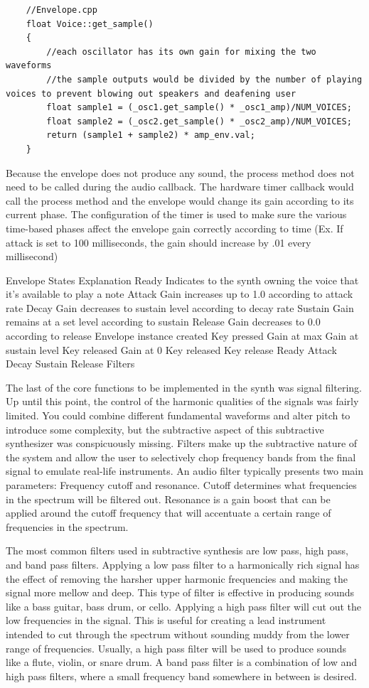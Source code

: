 \documentclass[acmlarge,screen]{acmart}
\begin{document}
	\begin{lstlisting}
	//Envelope.cpp
	float Voice::get_sample()
	{   
		//each oscillator has its own gain for mixing the two waveforms
		//the sample outputs would be divided by the number of playing voices to prevent blowing out speakers and deafening user
		float sample1 = (_osc1.get_sample() * _osc1_amp)/NUM_VOICES; 
		float sample2 = (_osc2.get_sample() * _osc2_amp)/NUM_VOICES;
		return (sample1 + sample2) * amp_env.val;
	}
	\end{lstlisting}
	Because the envelope does not produce any sound, the process method does not need to be called during the audio callback. The hardware timer callback would call the process method and the envelope would change its gain according to its current phase. The configuration of the timer is used to make sure the various time-based phases affect the envelope gain correctly according to time (Ex. If attack is set to 100 milliseconds, the gain should increase by .01 every millisecond)
	
	Envelope States	Explanation
	Ready	Indicates to the synth owning the voice that it's available to play a note
	Attack	Gain increases up to 1.0 according to attack rate
	Decay	Gain decreases to sustain level according to decay rate
	Sustain	Gain remains at a set level according to sustain
	Release	Gain decreases to 0.0 according to release
	Envelope instance created
	Key pressed
	Gain at max
	Gain at sustain level
	Key released
	Gain at 0
	Key released
	Key release
	Ready
	Attack
	Decay
	Sustain
	Release
	Filters
	
	
The last of the core functions to be implemented in the synth was signal filtering. Up until this point, the control of the harmonic qualities of the signals was fairly limited. You could combine different fundamental waveforms and alter pitch to introduce some complexity, but the subtractive aspect of this subtractive synthesizer was conspicuously missing. Filters make up the subtractive nature of the system and allow the user to selectively chop frequency bands from the final signal to emulate real-life instruments. An audio filter typically presents two main parameters: Frequency cutoff and resonance. Cutoff determines what frequencies in the spectrum will be filtered out. Resonance is a gain boost that can be applied around the cutoff frequency that will accentuate a certain range of frequencies in the spectrum.

The most common filters used in subtractive synthesis are low pass, high pass, and band pass filters. Applying a low pass filter to a harmonically rich signal has the effect of removing the harsher upper harmonic frequencies and making the signal more mellow and deep. This type of filter is effective in producing sounds like a bass guitar, bass drum, or cello. Applying a high pass filter will cut out the low frequencies in the signal. This is useful for creating a lead instrument intended to cut through the spectrum without sounding muddy from the lower range of frequencies. Usually, a high pass filter will be used to produce sounds like a flute, violin, or snare drum. A band pass filter is a combination of low and high pass filters, where a small frequency band somewhere in between is desired.
\end{document}
